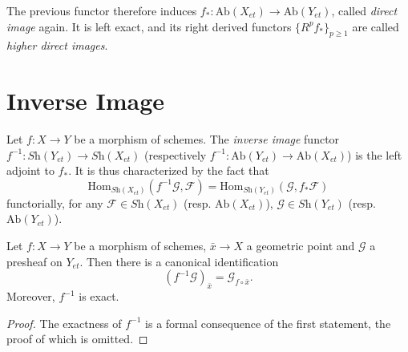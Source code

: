 \begin{definition}
\label{definition-direct-image-sheaf}
The previous functor therefore induces $f_*:\text{Ab}(X_{et})\to 
\text{Ab}(Y_{et})$, called {\it direct image} again. It is left exact, and its 
right derived functors $\{R^pf_*\}_{p \geq 1}$ are called
{\it higher direct images}.  
\end{definition}





\section{Inverse Image}
\label{section-inverse-image}

\begin{definition}
\label{definition-inverse-image}
Let $f: X\to Y$ be a morphism of schemes. The {\it inverse image} functor  
$f^{-1} : \textit{Sh}(Y_{et})\to \textit{Sh}(X_{et})$
(respectively
$f^{-1}: \text{Ab}(Y_{et}) \to \text{Ab}(X_{et})$)
is the left adjoint to $f_*$. It is 
thus characterized by the fact that 
$$
\text{Hom}_{{\textit{Sh}(X_{et})}} (f^{-1}\mathcal{G}, \mathcal{F}) = 
\text{Hom}_{\textit{Sh}(Y_{et})} (\mathcal{G}, f_*\mathcal{F}) 
$$
functorially, for any $\mathcal{F} \in \textit{Sh}(X_{et})$ (resp. 
$\text{Ab}(X_{et})$), $\mathcal{G} \in \textit{Sh}(Y_{et})$ (resp. 
$\text{Ab}(Y_{et})$).
\end{definition}

\begin{lemma}
\label{lemma-stalk-pullback}
Let $f : X \to Y$ be a morphism of schemes, $\bar x \to X$ a geometric point 
and $\mathcal{G}$ a presheaf on $Y_{et}$. Then there is a canonical 
identification 
$$
\left(f^{-1}\mathcal{G}\right)_{\bar x} = \mathcal{G}_{f\circ \bar x}.
$$
Moreover, $f^{-1}$ is exact.
\end{lemma}

\begin{proof}
The exactness of $f^{-1}$ is a formal consequence of the first statement, the 
proof of which is omitted.
\end{proof}

